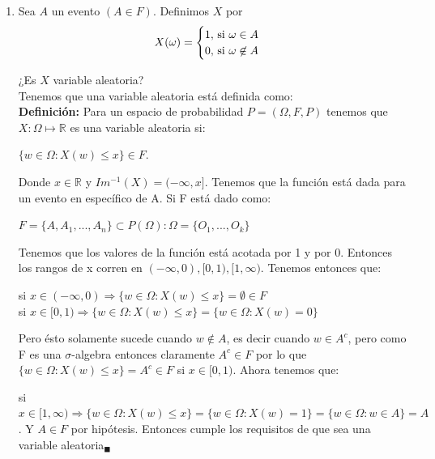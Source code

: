 \documentclass[12pt,a4paper]{report}
\begin{document}
	\begin{enumerate}
  
		\item {
			Sea $A$ un evento $(A \in F)$. Definimos $X$ por
			\[
				X(\omega) =
				\begin{cases}
					1, $ si $\omega \in A\\
					0, $ si $\omega \not\in A
				\end{cases}
			\]
      
			¿Es $X$ variable aleatoria?\\
			
			Tenemos que una variable aleatoria está definida como: \\
			\textbf{Definición:} Para un espacio de probabilidad $P=(\Omega,F,P)$ tenemos que $X:\Omega \mapsto \mathds{R}$ es una variable aleatoria si:
        		   	\begin{center}
			   $ \lbrace w\in \Omega : X(w) \leq x \rbrace \in F.$
			\end{center}
			Donde $x\in \mathds{R}$ y $Im^{-1}(X)=(-\infty,x]$. Tenemos que la función está dada para un evento en específico de A. Si F está dado como:
			\begin{center}
			    $F= \lbrace A, A_{1},...,A_{n} \rbrace \subset P(\Omega): \Omega = \lbrace O_{1},...,O_{k} \rbrace $
			\end{center}
			Tenemos que los valores de la función está acotada por 1 y por 0. Entonces los rangos de x corren en $(-\infty,0),[0,1),[1,\infty)$. Tenemos entonces que:\\
		    \begin{center}
		        si $x\in (-\infty,0) \Rightarrow \lbrace w \in \Omega: X(w) \leq x \rbrace =  \emptyset  \in F $\\
		        si $x\in [0,1)  \Rightarrow \lbrace w \in \Omega: X(w) \leq x \rbrace = \lbrace w\in \Omega : X(w)=0 \rbrace$
		    \end{center}
		    Pero ésto solamente sucede cuando $w\notin A $, es decir cuando $w \in A^c$, pero como F es una $\sigma$-algebra entonces claramente $A^c\in F$ por lo que $\lbrace w \in \Omega : X(w) \leq x \rbrace = A^c \in F$ si $x\in [0,1)$.  Ahora tenemos que:
		    \begin{center}
		        si $x\in [1,\infty) \Rightarrow \lbrace w \in \Omega : X(w) \leq x \rbrace = \lbrace w \in \Omega : X(w)=1 \rbrace  = \lbrace w\in \Omega: w \in A \rbrace = A$. 
		        Y $A \in F$ por hipótesis. Entonces cumple los requisitos de que sea una variable aleatoria$_{\blacksquare}$
		    \end{center}			
					
}
\end{enumerate}
\end{document}

